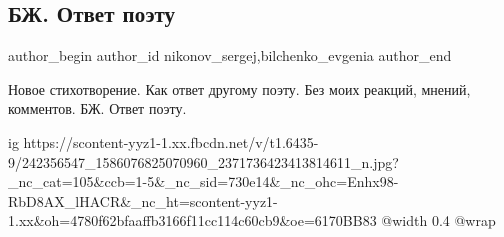  
 
 
 
 
 
\subsection{БЖ. Ответ поэту}
\label{sec:21_09_2021.fb.nikonov_sergej.7.bilchenko_otvet_poetu}
 
\ifcmt
 author_begin
   author_id nikonov_sergej,bilchenko_evgenia
 author_end
\fi

Новое стихотворение. Как ответ другому поэту. Без моих реакций, мнений, комментов.
БЖ. Ответ поэту.

\ifcmt
  ig https://scontent-yyz1-1.xx.fbcdn.net/v/t1.6435-9/242356547_1586076825070960_2371736423413814611_n.jpg?_nc_cat=105&ccb=1-5&_nc_sid=730e14&_nc_ohc=Enhx98-RbD8AX_lHACR&_nc_ht=scontent-yyz1-1.xx&oh=4780f62bfaaffb3166f11cc114c60cb9&oe=6170BB83
  @width 0.4
  @wrap 
\fi

